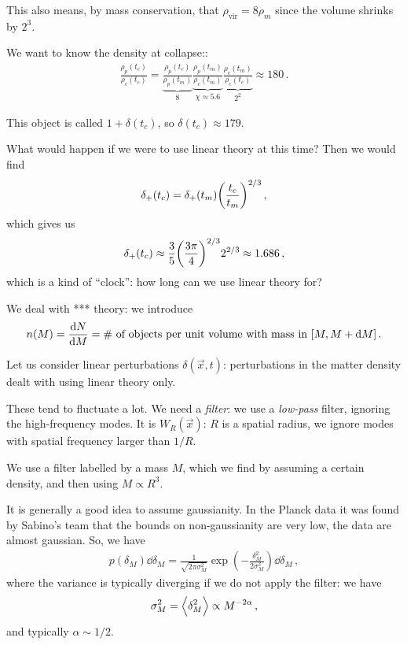 \documentclass[main.tex]{subfiles}
\begin{document}
This also means, by mass conservation, that \(\rho _{\text{vir}} = 8 \rho_{m}\) since the volume shrinks by \(2^{3}\). 

We want to know the density at collapse:: 
%
\begin{align}
\frac{\rho_{p}(t_c)}{\rho_{c}(t_c)} = \underbrace{\frac{\rho_{p}(t_c)}{\rho_{p}(t_m)}}_{8} \underbrace{\frac{\rho_{p}(t_m)}{\rho_{c}(t_m)}}_{\chi \approx 5.6} \underbrace{\frac{\rho_{c}(t_m)}{\rho_{c} (t_c)}}_{2^2}
\approx 180
\,.
\end{align}

This object is called \(1 + \delta(t_c) \), so \(\delta (t_c) \approx 179\). 

What would happen if we were to use linear theory at this time? Then we would find 
%
\begin{align}
\delta_{+} (t_c) = \delta_{+}(t_m) \qty(\frac{t_c}{t_m})^{2/3}
\,,
\end{align}
%
which gives us
%
\begin{align}
\delta_+ (t_c) \approx \frac{3}{5} \qty(\frac{3 \pi }{4})^{2/3} 2^{2/3} \approx 1.686 
\,,
\end{align}
%
which is a kind of ``clock'': how long can we use linear theory for? 

We deal with *** theory: we introduce 
%
\begin{align}
n(M) = \dv{N}{M} = \text{\# of objects per unit volume with mass in } [M, M + \dd{M}]
\,.
\end{align}

Let us consider linear perturbations \(\delta(\vec{x}, t)\): perturbations in the matter density dealt with using linear theory only. 

These tend to fluctuate a lot. We need a \emph{filter}: we use a \emph{low-pass} filter, ignoring the high-frequency modes. It is \(W_R(\vec{x})\): \(R\) is a spatial radius, we ignore modes with spatial frequency larger than \(1/R\). 

We use a filter labelled by a mass \(M\), which we find by assuming a certain density, and then using \(M \propto R^3\). 

It is generally a good idea to assume gaussianity. In the Planck data it was found by Sabino's team that the bounds on non-gaussianity are very low, the data are almost gaussian. So, we have 
%
\begin{align}
p(\delta_{M}) \dd{ \delta_{M}} = \frac{1}{\sqrt{2 \pi \sigma_{M}^2}} \exp( - \frac{ \delta_{M}^2}{2 \sigma_{M}^2}) \dd{ \delta_{M}}
\,,
\end{align}
%
where the variance is typically diverging if we do not apply the filter: we have 
%
\begin{align}
\sigma_{M}^2    = \expval{ \delta_{M}^2 } \propto M^{-2 \alpha }
\,,
\end{align}
%
and typically \(\alpha \sim 1/2\). 
\end{document}
